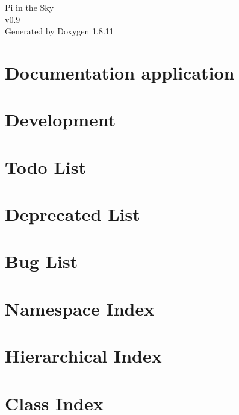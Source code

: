 \documentclass[twoside]{book}
\newcommand{\+}{\discretionary{\mbox{\scriptsize$\hookleftarrow$}}{}{}}
\newcommand{\clearemptydoublepage}{%
  \newpage{\pagestyle{empty}\cleardoublepage}%
}
\begin{document}
\hypersetup{pageanchor=false,
             bookmarksnumbered=true,
             pdfencoding=unicode
            }
\begin{titlepage}
\vspace*{7cm}
\begin{center}%
{\Large Pi in the Sky \\[1ex]\large v0.\+9 }\\
\vspace*{1cm}
{\large Generated by Doxygen 1.8.11}\\
\end{center}
\end{titlepage}
\clearemptydoublepage
\tableofcontents
\clearemptydoublepage
{}
\hypersetup{pageanchor=true}

\chapter{Documentation application}
\label{index}\hypertarget{index}{}
\chapter{Development}
\label{page1}
\hypertarget{page1}{}

\chapter{Todo List}
\label{todo}
\hypertarget{todo}{}

\chapter{Deprecated List}
\label{deprecated}
\hypertarget{deprecated}{}

\chapter{Bug List}
\label{bug}
\hypertarget{bug}{}

\chapter{Namespace Index}

\chapter{Hierarchical Index}

\chapter{Class Index}

\end{document}
